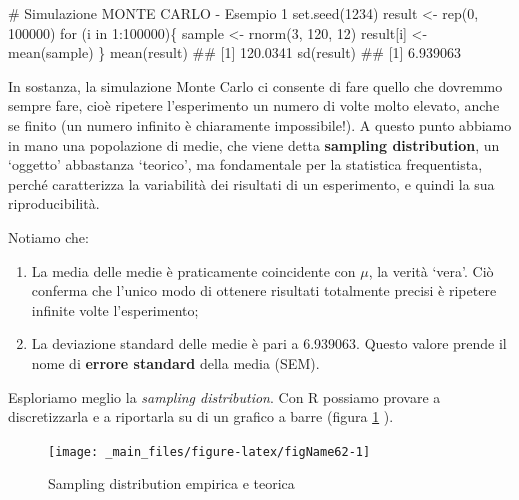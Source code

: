 \documentclass[a4paper,12pt,oneside]{book}
\providecommand{\tightlist}{%
  \setlength{\itemsep}{0pt}\setlength{\parskip}{0pt}}
\newenvironment{Shaded}{}{}
\newcommand{\KeywordTok}[1]{#1}
\newcommand{\DecValTok}[1]{#1}
\newcommand{\StringTok}[1]{#1}
\newcommand{\CommentTok}[1]{#1}
\newcommand{\ControlFlowTok}[1]{#1}
\newcommand{\OperatorTok}[1]{#1}
\newcommand{\NormalTok}[1]{#1}
\begin{document}
\begin{Shaded}
\begin{Highlighting}[]
\CommentTok{# Simulazione MONTE CARLO - Esempio 1}
\KeywordTok{set.seed}\NormalTok{(}\DecValTok{1234}\NormalTok{)}
\NormalTok{result <-}\StringTok{ }\KeywordTok{rep}\NormalTok{(}\DecValTok{0}\NormalTok{, }\DecValTok{100000}\NormalTok{)}
\ControlFlowTok{for}\NormalTok{ (i }\ControlFlowTok{in} \DecValTok{1}\OperatorTok{:}\DecValTok{100000}\NormalTok{)\{}
\NormalTok{  sample <-}\StringTok{ }\KeywordTok{rnorm}\NormalTok{(}\DecValTok{3}\NormalTok{, }\DecValTok{120}\NormalTok{, }\DecValTok{12}\NormalTok{)}
\NormalTok{  result[i] <-}\StringTok{ }\KeywordTok{mean}\NormalTok{(sample)}
\NormalTok{\}}
\KeywordTok{mean}\NormalTok{(result)}
\CommentTok{## [1] 120.0341}
\KeywordTok{sd}\NormalTok{(result)}
\CommentTok{## [1] 6.939063}
\end{Highlighting}
\end{Shaded}

In sostanza, la simulazione Monte Carlo ci consente di fare quello che dovremmo sempre fare, cioè ripetere l'esperimento un numero di volte molto elevato, anche se finito (un numero infinito è chiaramente impossibile!). A questo punto abbiamo in mano una popolazione di medie, che viene detta \textbf{sampling distribution}, un `oggetto' abbastanza `teorico', ma fondamentale per la statistica frequentista, perché caratterizza la variabilità dei risultati di un esperimento, e quindi la sua riproducibilità.

Notiamo che:

\begin{enumerate}
\def\labelenumi{\arabic{enumi}.}
\tightlist
\item
  La media delle medie è praticamente coincidente con \(\mu\), la verità `vera'. Ciò conferma che l'unico modo di ottenere risultati totalmente precisi è ripetere infinite volte l'esperimento;
\item
  La deviazione standard delle medie è pari a 6.939063. Questo valore prende il nome di \textbf{errore standard} della media (SEM).
\end{enumerate}

Esploriamo meglio la \emph{sampling distribution}. Con R possiamo provare a discretizzarla e a riportarla su di un grafico a barre (figura \ref{fig:figName62} ).

\begin{figure}

{\centering \texttt{[image: \_main\_files/figure-latex/figName62-1]} 

}

\caption{Sampling distribution empirica e teorica}\label{fig:figName62}
\end{figure}
\end{document}
